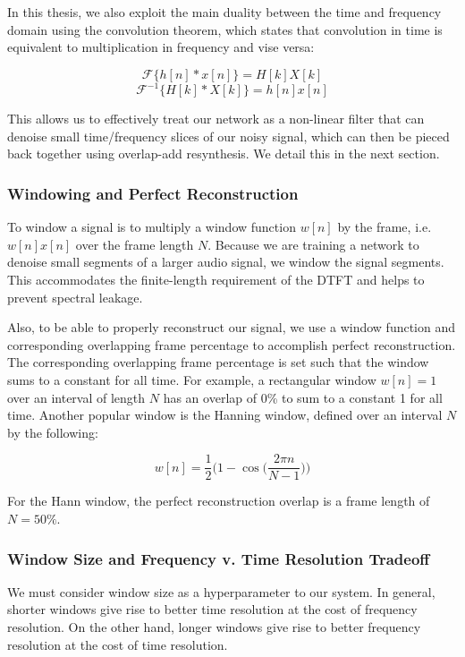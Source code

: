 In this thesis, we also exploit the main duality between the time and frequency domain using the convolution theorem, which states that convolution in time is equivalent to multiplication in frequency and vise versa:

\begin{equation}
\mathscr{F} \{h[n] * x[n]\} = H[k] X[k]
\end{equation}
\begin{equation}
\mathscr{F}^{-1} \{H[k] * X[k]\} = h[n] x[n]
\end{equation}

This allows us to effectively treat our network as a non-linear filter that can denoise small time/frequency slices of our noisy signal, which can then be pieced back together using overlap-add resynthesis. We detail this in the next section.

\subsubsection{Windowing and Perfect Reconstruction}
To window a signal is to multiply a window function $w[n]$ by the frame, i.e. $w[n]x[n]$ over the frame length $N$. Because we are training a network to denoise small segments of a larger audio signal, we window the signal segments. This accommodates the finite-length requirement of the DTFT and helps to prevent spectral leakage. \cite{alan1989discrete}

Also, to be able to properly reconstruct our signal, we use a window function and corresponding overlapping frame percentage to accomplish perfect reconstruction. The corresponding overlapping frame percentage is set such that the window sums to a constant for all time. For example, a rectangular window $w[n]=1$ over an interval of length $N$ has an overlap of 0\% to sum to a constant 1 for all time. Another popular window is the Hanning window, defined over an interval $N$ by the following:

\begin{equation}
w[n] = \dfrac{1}{2} \bigg( 1-\cos \bigg(\dfrac{2 \pi n}{N - 1} \bigg)\bigg)
\end{equation}

For the Hann window, the perfect reconstruction overlap is a frame length of $N=50\%$.

\subsubsection{Window Size and Frequency v. Time Resolution Tradeoff}
We must consider window size as a hyperparameter to our system. In general, shorter windows give rise to better time resolution at the cost of frequency resolution. On the other hand, longer windows give rise to better frequency resolution at the cost of time resolution. %



